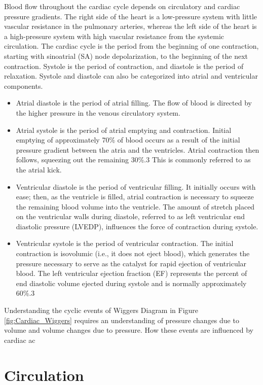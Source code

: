 Blood flow throughout the cardiac cycle depends on circulatory and cardiac pressure gradients. The right side of the heart is a low-pressure system with little vascular resistance in the pulmonary arteries, whereas the left side of the heart is a high-pressure system with high vascular resistance from the systemic circulation. The cardiac cycle is the period from the beginning of one contraction, starting with sinoatrial (SA) node depolarization, to the beginning of the next contraction. Systole is the period of contraction, and diastole is the period of relaxation. Systole and diastole can also be categorized into atrial and ventricular components.

\begin{itemize}
    \item Atrial diastole is the period of atrial filling. The flow of blood is directed by the higher pressure in the venous circulatory system.
    \item Atrial systole is the period of atrial emptying and contraction. Initial emptying of approximately 70\% of blood occurs as a result of the initial pressure gradient between the atria and the ventricles. Atrial contraction then follows, squeezing out the remaining 30\%.3 This is commonly referred to as the atrial kick.
    \item Ventricular diastole is the period of ventricular filling. It initially occurs with ease; then, as the ventricle is filled, atrial contraction is necessary to squeeze the remaining blood volume into the ventricle. The amount of stretch placed on the ventricular walls during diastole, referred to as left ventricular end diastolic pressure (LVEDP), influences the force of contraction during systole.
    \item Ventricular systole is the period of ventricular contraction. The initial contraction is isovolumic (i.e., it does not eject blood), which generates the pressure necessary to serve as the catalyst for rapid ejection of ventricular blood. The left ventricular ejection fraction (EF) represents the percent of end diastolic volume ejected during systole and is normally approximately 60\%.3
\end{itemize}

Understanding the cyclic events of Wiggers Diagram in Figure \ref{fig:Cardiac_Wiggers} requires an understanding of pressure changes due to volume and volume changes due to pressure. How these events are influenced by cardiac ac

\section{Circulation}

